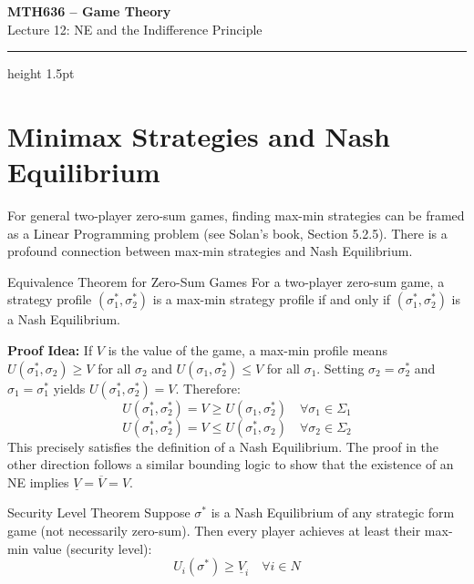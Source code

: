 \documentclass[12pt, a4paper]{article}
\begin{document}
\begin{center}
  {\LARGE\bfseries\sffamily\color{defblue} MTH636 -- Game Theory}\\[6pt]
  {\Large\sffamily Lecture 12: NE and the Indifference Principle}\\[4pt]
\end{center}
\vspace{0.5cm}
\hrule height 1.5pt
\vspace{0.3cm}

\section{Minimax Strategies and Nash Equilibrium}

For general two-player zero-sum games, finding max-min strategies can be framed as a Linear Programming problem (see Solan's book, Section 5.2.5). There is a profound connection between max-min strategies and Nash Equilibrium.

\begin{thmbox}{Equivalence Theorem for Zero-Sum Games}
  For a two-player zero-sum game, a strategy profile $(\sigma_1^*, \sigma_2^*)$ is a max-min strategy profile if and only if $(\sigma_1^*, \sigma_2^*)$ is a Nash Equilibrium.
\end{thmbox}

\textbf{Proof Idea:}
If $V$ is the value of the game, a max-min profile means $U(\sigma_1^*, \sigma_2) \geq V$ for all $\sigma_2$ and $U(\sigma_1, \sigma_2^*) \leq V$ for all $\sigma_1$. 
Setting $\sigma_2 = \sigma_2^*$ and $\sigma_1 = \sigma_1^*$ yields $U(\sigma_1^*, \sigma_2^*) = V$.
Therefore:
\[
  U(\sigma_1^*, \sigma_2^*) = V \geq U(\sigma_1, \sigma_2^*) \quad \forall \sigma_1 \in \Sigma_1
\]
\[
  U(\sigma_1^*, \sigma_2^*) = V \leq U(\sigma_1^*, \sigma_2) \quad \forall \sigma_2 \in \Sigma_2
\]
This precisely satisfies the definition of a Nash Equilibrium. The proof in the other direction follows a similar bounding logic to show that the existence of an NE implies $\underline{V} = \overline{V} = V$.

\begin{thmbox}{Security Level Theorem}
  Suppose $\sigma^*$ is a Nash Equilibrium of any strategic form game (not necessarily zero-sum). Then every player achieves at least their max-min value (security level):
  \[
    U_i(\sigma^*) \geq \underline{V}_i \quad \forall i \in N
  \]
\end{thmbox}
\end{document}
